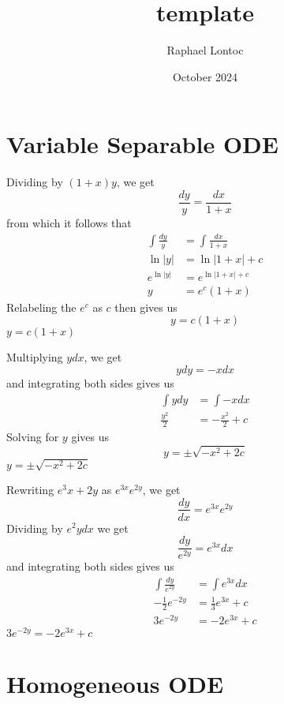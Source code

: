 \documentclass{report}
\title{template}
\author{Raphael Lontoc}
\date{October 2024}
\begin{document}
\maketitle

\chapter*{Variable Separable ODE}

\soln Dividing by $(1+x)y$, we get
\[
    \frac{dy}{y} = \frac{dx}{1+x}
\]
from which it follows that
\begin{align*}
    \int \frac{dy}{y} &= \int \frac{dx}{1+x} \\
    \ln|y| &= \ln|1+x| + c \\ 
    e^{\ln|y|} &= e^{\ln|1+x| + c} \\
    y &= e^c(1+x)
\end{align*}
Relabeling the $e^c$ as $c$ then gives us
\[
    y=c(1+x)
\]
\ans $y=c(1+x)$

\medskip

\soln Multiplying $y dx$, we get
\[
    y dy = -x dx
\]
and integrating both sides gives us
\begin{align*}
    \int y dy &= \int -x dx \\
    \frac{y^2}{2} &= -\frac{x^2}{2} + c
\end{align*}
Solving for $y$ gives us
\[
    y = \pm\sqrt{-x^2+2c}
\]
\ans $y = \pm\sqrt{-x^2+2c}$

\medskip

\soln Rewriting $e^3x+2y$ as $e^{3x}e^{2y}$, we get
\[
    \frac{dy}{dx} = e^{3x}e^{2y}
\]
Dividing by $e^2y dx$ we get
\[
    \frac{dy}{e^{2y}} = e^{3x}dx
\]
and integrating both sides gives us
\begin{align*}
    \int \frac{dy}{e^{2y}} &= \int e^{3x}dx \\
    -\frac{1}{2}e^{-2y} &= \frac{1}{3}e^{3x} + c \\
    3e^{-2y} &= -2e^{3x} + c
\end{align*}
\ans $3e^{-2y} = -2e^{3x} + c$

\pagebreak

\chapter*{Homogeneous ODE}
\end{document}
